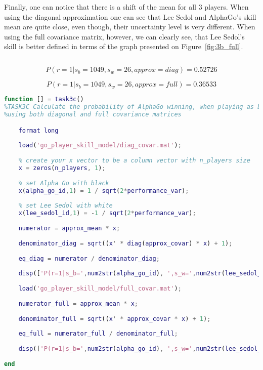 \documentclass[a4paper,11pt]{article}
\theoremstyle{mytheor}
\begin{document}
Finally, one can notice that there is a shift of the mean for all 3 players. When using the diagonal approximation one can see that Lee Sedol and AlphaGo's skill mean are quite close, even though, their uncertainty level is very different. When using the full covariance matrix, however, we can clearly see, that Lee Sedol's skill is better defined in terms of the graph presented on Figure~\ref{fig:3b_full}.

\subsection{}
\begin{equation}
    P(r=1|s_b=1049,s_w=26,approx=diag)=0.52726
    \label{eq:ag_vs_ls_diag}
\end{equation}

\begin{equation}
    P(r=1|s_b=1049,s_w=26,approx=full)=0.36533
    \label{eq:ag_vs_ls_full}
\end{equation}

\begin{lstlisting}[label={list:3c},caption=Code for computing the probability of AlphaGo winning when playing black against Lee Sedol using both full and diagonal covariance matrices.,language=MATLAB]
function [] = task3c()
%TASK3C Calculate the probability of AlphaGo winning, when playing as black
%using both diagonal and full covariance matrices

    format long
    
    load('go_player_skill_model/diag_covar.mat');
    
    % create your x vector to be a column vector with n_players size
    x = zeros(n_players, 1);
    
    % set Alpha Go with black
    x(alpha_go_id,1) = 1 / sqrt(2*performance_var);
    
    % set Lee Sedol with white
    x(lee_sedol_id,1) = -1 / sqrt(2*performance_var);
    
    numerator = approx_mean * x;
    
    denominator_diag = sqrt((x' * diag(approx_covar) * x) + 1);
    
    eq_diag = numerator / denominator_diag;
    
    disp(['P(r=1|s_b=',num2str(alpha_go_id), ',s_w=',num2str(lee_sedol_id),',approx=diag)=',num2str(normcdf(eq_diag))]);
    
    load('go_player_skill_model/full_covar.mat');
    
    numerator_full = approx_mean * x;
    
    denominator_full = sqrt((x' * approx_covar * x) + 1);
    
    eq_full = numerator_full / denominator_full;
    
    disp(['P(r=1|s_b=',num2str(alpha_go_id), ',s_w=',num2str(lee_sedol_id),',approx=full)=',num2str(normcdf(eq_full))]);
    
end
\end{lstlisting}
\end{document}
